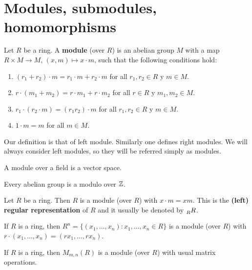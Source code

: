 \chapter{Modules, submodules, homomorphisms}

\begin{definition}
    Let $R$ be a ring. A \textbf{module} (over $R$) is an abelian group
    $M$ with a map $R\times M\to M$, $(x,m)\mapsto x\cdot m$, such that
    the following conditions hold:
    \begin{enumerate}
        \item $(r_1+r_2)\cdot m=r_1\cdot m+r_2\cdot m$ for all $r_1,r_2\in R$ y $m\in M$.
		\item $r\cdot (m_1+m_2)=r\cdot m_1+r\cdot m_2$ for all $r\in R$ y $m_1,m_2\in M$.
		\item $r_1\cdot (r_2\cdot m)=(r_1r_2)\cdot m$ for all $r_1,r_2\in R$ y $m\in M$.
		\item $1\cdot m=m$ for all $m\in M$.	
    \end{enumerate}
\end{definition}

Our definition is that of left module. Similarly one defines right modules. We will always
consider left modules, so they will be referred simply as modules.

\begin{example}
A module over a field is a vector space. 
\end{example}

\begin{example}
Every abelian group is a modulo over $\mathbb{Z}$.	
\end{example}

\begin{example}
Let $R$ be a ring. Then $R$ is a module (over $R$) with $x\cdot m=xm$. 
This is the \textbf{(left) regular representation} of $R$ and it usually 
be denoted by $\prescript{}{R}R$. 
\end{example}

\begin{example}
If $R$ is a ring, then $R^n=\{(x_1,\dots,x_n):x_1,\dots,x_n\in R\}$ 
is a module (over $R$) with  
$r\cdot (x_1,\dots,x_n)=(rx_1,\dots,rx_n)$. 
\end{example}

\begin{example}
If $R$ is a ring, then $M_{m,n}(R)$ is a module (over $R$) with usual matrix operations. 
\end{example}

